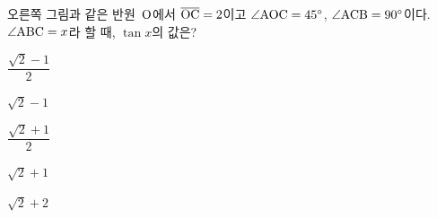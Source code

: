 \noindent\begin{minipage}[t]{0.58\linewidth}\vspace{0pt}\raggedright 오른쪽 그림과 같은 반원~$\mathrm{O}$에서 $\overline{\mathrm{OC}}=2$이고 $\angle\mathrm{AOC}=45^\circ$, $\angle\mathrm{ACB}=90^\circ$이다. $\angle\mathrm{ABC}=x$라 할 때, $\tan x$의 값은?\end{minipage}\hfill\begin{minipage}[t]{0.4\linewidth}\vspace{0pt}\centering \resizebox{\ifdim\width>\linewidth\linewidth\else\width\fi}{!}{}\end{minipage}\par
\begin{choices32}{\rule[-3ex]{0pt}{8ex}$\dfrac{\sqrt{2}-1}{2}$}{\rule[-3ex]{0pt}{8ex}$\sqrt{2}-1$}{\rule[-3ex]{0pt}{8ex}$\dfrac{\sqrt{2}+1}{2}$}{\rule[-3ex]{0pt}{8ex}$\sqrt{2}+1$}{\rule[-3ex]{0pt}{8ex}$\sqrt{2}+2$}\end{choices32}
